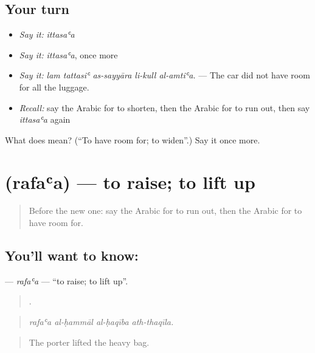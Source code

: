 \subsection*{Your turn}
\begin{itemize}
\raggedright
  \item \emph{Say it:} \emph{ittasaʿa}
  \item \emph{Say it:} \emph{ittasaʿa}, once more
  \item \emph{Say it:} \emph{lam tattasiʿ as-sayyāra li-kull al-amtiʿa.} — The car did not have room for all the luggage.
  \item \emph{Recall:} say the Arabic for to shorten, then the Arabic for to run out, then say \emph{ittasaʿa} again
\end{itemize}

\begin{tcolorbox}[breakable,colback=teal!4,colframe=teal!35!black,title={Before you move on}]
What does  mean? (\textquotedblleft{}To have room for; to widen\textquotedblright{}.) Say it once more.
\end{tcolorbox}
\section[\texorpdfstring{\ar{رفع} (rafaʿa)}{رفع (rafaʿa)}]{ (rafaʿa) — to raise; to lift up}

\label{lesson:AR-C462-rafaa}



\begin{quote}
Before the new one: say the Arabic for to run out, then the Arabic for to have room for.
\end{quote}

\subsection*{You'll want to know: }
\textbf{} — \emph{rafaʿa} — \textquotedblleft{}to raise; to lift up\textquotedblright{}.

\begin{quote}
   .
\end{quote}

\begin{quote}
\emph{rafaʿa al-ḥammāl al-ḥaqība ath-thaqīla.}
\end{quote}

\begin{quote}
The porter lifted the heavy bag.
\end{quote}

